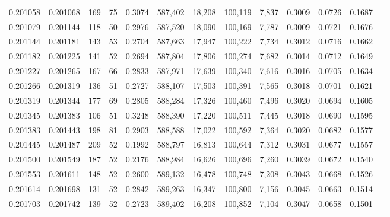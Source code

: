 \begin{tabular}{rrrrrrrrrrrrr}
0.201058 & 0.201068 &   169 &  75 &                                     0.3074 & 587,402 &  18,208 & 100,119 &   7,837 & 0.3009 & 0.0726 & 0.1687 \\
0.201079 & 0.201144 &   118 &  50 &                                     0.2976 & 587,520 &  18,090 & 100,169 &   7,787 & 0.3009 & 0.0721 & 0.1676 \\
0.201144 & 0.201181 &   143 &  53 &                                     0.2704 & 587,663 &  17,947 & 100,222 &   7,734 & 0.3012 & 0.0716 & 0.1662 \\
0.201182 & 0.201225 &   141 &  52 &                                     0.2694 & 587,804 &  17,806 & 100,274 &   7,682 & 0.3014 & 0.0712 & 0.1649 \\
0.201227 & 0.201265 &   167 &  66 &                                     0.2833 & 587,971 &  17,639 & 100,340 &   7,616 & 0.3016 & 0.0705 & 0.1634 \\
0.201266 & 0.201319 &   136 &  51 &                                     0.2727 & 588,107 &  17,503 & 100,391 &   7,565 & 0.3018 & 0.0701 & 0.1621 \\
0.201319 & 0.201344 &   177 &  69 &                                     0.2805 & 588,284 &  17,326 & 100,460 &   7,496 & 0.3020 & 0.0694 & 0.1605 \\
0.201345 & 0.201383 &   106 &  51 &                                     0.3248 & 588,390 &  17,220 & 100,511 &   7,445 & 0.3018 & 0.0690 & 0.1595 \\
0.201383 & 0.201443 &   198 &  81 &                                     0.2903 & 588,588 &  17,022 & 100,592 &   7,364 & 0.3020 & 0.0682 & 0.1577 \\
0.201445 & 0.201487 &   209 &  52 &                                     0.1992 & 588,797 &  16,813 & 100,644 &   7,312 & 0.3031 & 0.0677 & 0.1557 \\
0.201500 & 0.201549 &   187 &  52 &                                     0.2176 & 588,984 &  16,626 & 100,696 &   7,260 & 0.3039 & 0.0672 & 0.1540 \\
0.201553 & 0.201611 &   148 &  52 &                                     0.2600 & 589,132 &  16,478 & 100,748 &   7,208 & 0.3043 & 0.0668 & 0.1526 \\
0.201614 & 0.201698 &   131 &  52 &                                     0.2842 & 589,263 &  16,347 & 100,800 &   7,156 & 0.3045 & 0.0663 & 0.1514 \\
0.201703 & 0.201742 &   139 &  52 &                                     0.2723 & 589,402 &  16,208 & 100,852 &   7,104 & 0.3047 & 0.0658 & 0.1501 \\

\end{tabular}
